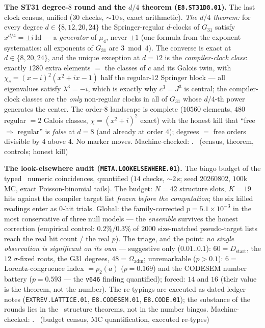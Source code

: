 \documentclass[11pt,a4paper]{article}
\theoremstyle{definition}
\begin{document}
\par\smallskip\noindent\textbf{The ST31 degree-$8$ round and the
$d/4$ theorem (\texttt{E8.ST31D8.01}).}
The last clock census, unified ($30$ checks, ${\sim}10$\,s, exact
arithmetic).  \emph{The $d/4$ theorem:} for every degree
$d\in\{8,12,20,24\}$ the Springer-regular $d$-clocks of $G_{31}$
satisfy $x^{d/4}=\pm i\,\mathrm{Id}$ --- a \emph{generator} of
$\mu_4$, never $\pm1$ (one formula from the exponent systematics:
all exponents of $G_{31}$ are $3\bmod4$).  The converse is exact at
$d\in\{8,20,24\}$, and the unique exception at $d=12$ is the
\emph{compiler-clock class}: exactly $1280$ extra elements $=$ the
classes of $c$ and its Galois twin, with
$\chi_c=(x-i)^2(x^2+ix-1)$ half the regular-$12$ Springer block ---
all eigenvalues satisfy $\lambda^3=-i$, which is exactly why
$c^3=J^3$ is central; the compiler-clock classes are the \emph{only}
non-regular clocks in all of $G_{31}$ whose $d/4$-th power generates
the center.  The order-$8$ landscape is complete ($10560$ elements,
$480$ regular $=2$ Galois classes, $\chi=(x^2+i)^2$ exact) with the
honest kill that ``free $\Rightarrow$ regular'' is \emph{false} at
$d=8$ (and already at order $4$); degrees $=$ free orders divisible
by $4$ above $4$.  No marker moves.
Machine-checked: .
\mE\ (census, theorem, controls; honest kill)
\par\smallskip

\par\smallskip\noindent\textbf{The look-elsewhere audit
(\texttt{META.LOOKELSEWHERE.01}).}
The bingo budget of the typed \mC\ numeric coincidences, quantified
($14$ checks, ${\sim}2$\,s; seed $20260802$, $100$k MC, exact
Poisson-binomial tails).  The budget: $N=42$ structure slots, $K=19$
hits against the compiler target list \emph{frozen before the
computation}; the six killed readings enter as $0$-hit trials.
Global: the family-corrected $p=5.1\times10^{-3}$ in the most
conservative of three null models --- the \emph{ensemble} survives
the honest correction (empirical control: $0.2\%/0.3\%$ of $2000$
size-matched pseudo-target lists reach the real hit count / the real
$p$).  The triage, and the point: \emph{no single observation is
significant on its own} --- suggestive only ($0.01..0.1$):
$60=D_{\mathrm{start}}$, the $12$ $\sigma$-fixed roots, the G31
degrees, $48=\Omega_{\mathrm{adm}}$; unremarkable ($p>0.1$): $6=$
Lorentz-congruence index $=p_2(a)$ ($p=0.169$) and the CODESEM
number battery ($p=0.593$ --- the \texttt{v646} finding quantified);
forced: $14$ and $16$ (their value is the theorem, not the number).
The re-typings are executed as dated ledger notes
(\texttt{EXTREV.LATTICE.01}, \texttt{E8.CODESEM.01},
\texttt{E8.CODE.01}); the substance of the rounds lies in the \mE\
structure theorems, not in the number bingos.
Machine-checked: .
\mE\ (budget census, MC quantification, executed re-types)
\par\smallskip
\end{document}
